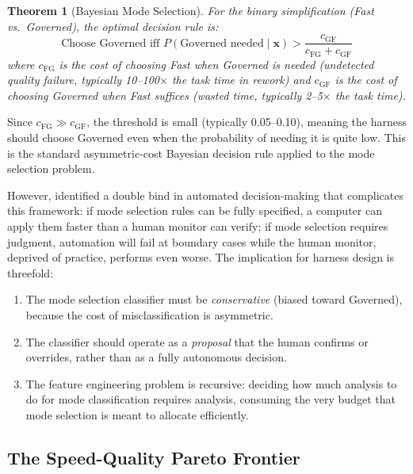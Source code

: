 \documentclass[11pt, a4paper]{googledeepmind}
\newtheorem{theorem}{Theorem}[section]
\begin{document}
\begin{theorem}[Bayesian Mode Selection]
\label{thm:bayesian-mode}
For the binary simplification (Fast vs.\ Governed), the optimal decision rule is:
\begin{equation}
    \text{Choose Governed iff } P(\text{Governed needed} \mid \mathbf{x}) > \frac{c_{\mathrm{GF}}}{c_{\mathrm{FG}} + c_{\mathrm{GF}}}
\end{equation}
where $c_{\mathrm{FG}}$ is the cost of choosing Fast when Governed is needed (undetected quality failure, typically 10--100$\times$ the task time in rework) and $c_{\mathrm{GF}}$ is the cost of choosing Governed when Fast suffices (wasted time, typically 2--5$\times$ the task time).
\end{theorem}

Since $c_{\mathrm{FG}} \gg c_{\mathrm{GF}}$, the threshold is small (typically 0.05--0.10), meaning the harness should choose Governed even when the probability of needing it is quite low. This is the standard asymmetric-cost Bayesian decision rule applied to the mode selection problem.

However, \citet{bainbridge1983ironies} identified a double bind in automated decision-making that complicates this framework: if mode selection rules can be fully specified, a computer can apply them faster than a human monitor can verify; if mode selection requires judgment, automation will fail at boundary cases while the human monitor, deprived of practice, performs even worse. The implication for harness design is threefold:

\begin{enumerate}[nosep]
    \item The mode selection classifier must be \emph{conservative} (biased toward Governed), because the cost of misclassification is asymmetric.
    \item The classifier should operate as a \emph{proposal} that the human confirms or overrides, rather than as a fully autonomous decision.
    \item The feature engineering problem is recursive: deciding how much analysis to do for mode classification requires analysis, consuming the very budget that mode selection is meant to allocate efficiently.
\end{enumerate}

\subsection{The Speed-Quality Pareto Frontier}
\end{document}
